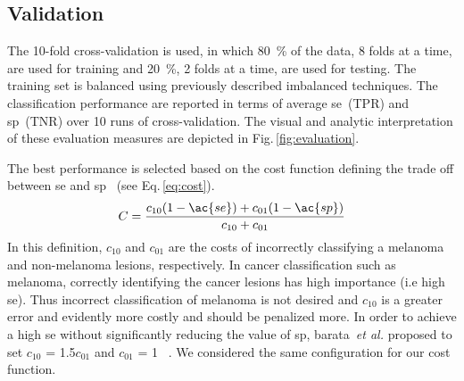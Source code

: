 \subsection{Validation}
The 10-fold cross-validation is used, in which \SI{80}{\percent} of the data, 8 folds at a time, are used for training and \SI{20}{\percent}, 2 folds at a time, are used for testing. 
The training set is balanced using previously described imbalanced techniques. 
The classification performance are reported in terms of average \ac{se}~(TPR) and \ac{sp}~(TNR) over 10 runs of cross-validation. 
The visual and analytic interpretation of these evaluation measures are depicted in Fig.\,\ref{fig:evaluation}.

The best performance is selected based on the cost function defining the trade off between \ac{se} and \ac{sp}~\cite{barata2013towards} (see Eq.\,\ref{eq:cost}).
\begin{equation}\label{eq:cost}
C = \frac{c_{10}(1-\ac{se})+c_{01}(1-\ac{sp})}{c_{10}+c_{01}}
\end{equation}
\noindent In this definition, $c_{10}$ and $c_{01}$ are the costs of incorrectly classifying a melanoma and non-melanoma lesions, respectively.
In cancer classification such as melanoma, correctly identifying the cancer lesions has high importance (i.e high \ac{se}). 
Thus incorrect classification of melanoma is not desired and $c_{10}$ is a greater error and evidently more costly and should be penalized more. 
In order to achieve a high \ac{se} without significantly reducing the value of \ac{sp}, barata~\emph{et al.} proposed to set $c_{10}$ = 1.5$c_{01}$ and $c_{01}$ = 1 ~\cite{barata2013towards}.  
We considered the same configuration for our cost function. 

